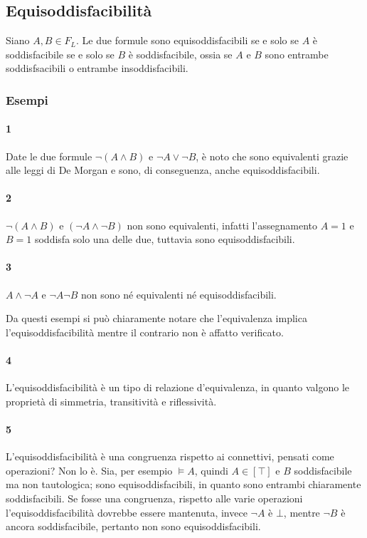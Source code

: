 \subsection{Equisoddisfacibilità}
\begin{defi}[Equisoddisfacibilità]
        Siano $A, B \in F_L$. Le due formule sono equisoddisfacibili se e solo 
        se $A$ è soddisfacibile se e solo se $B$ è soddisfacibile, ossia 
        se $A$ e $B$ sono entrambe soddisfsacibili o entrambe insoddisfacibili. 
\end{defi}

\subsubsection{Esempi}
\paragraph{1}
Date le due formule $\neg (A \land B)$ e $\neg A \lor \neg B$, è noto 
che sono equivalenti grazie alle leggi di De Morgan e sono, di conseguenza, 
anche equisoddisfacibili.
\paragraph{2} $\neg (A \land B)$ e $(\neg A \land \neg B)$ non sono equivalenti, 
infatti l'assegnamento $A=1$ e $B=1$ soddisfa solo una delle due, tuttavia 
sono equisoddisfacibili.
\paragraph{3} $A \land \neg A$ e $\neg A \neg B$ non sono né equivalenti né
equisoddisfacibili.

Da questi esempi si può chiaramente notare che l'equivalenza implica l'equisoddisfacibilità 
mentre il contrario non è affatto verificato.

\paragraph{4}
L'equisoddisfacibilità è un tipo di relazione d'equivalenza, in quanto 
valgono le proprietà di simmetria, transitività e riflessività.
\paragraph{5} L'equisoddisfacibilità è una congruenza rispetto ai 
connettivi, pensati come operazioni? Non lo è. Sia, per esempio 
$\models A$, quindi $A \in [\top]$ e $B$ soddisfacibile ma non tautologica; 
sono equisoddisfacibili, in quanto sono entrambi chiaramente soddisfacibili. 
Se fosse una congruenza, rispetto alle varie operazioni l'equisoddisfacibilità 
dovrebbe essere mantenuta, invece $\neg A$ è $\bot$, mentre $\neg B$ è 
ancora soddisfacibile, pertanto non sono equisoddisfacibili.

